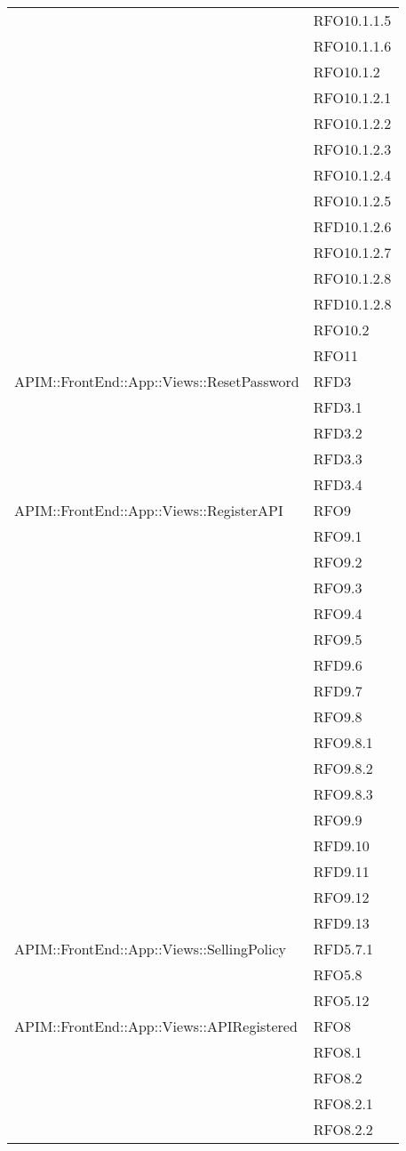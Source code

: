 \begin{longtable}{ p{12cm} | p{4cm} }
	& RFO10.1.1.5 \\
	& RFO10.1.1.6 \\
	& RFO10.1.2 \\
	& RFO10.1.2.1 \\
	& RFO10.1.2.2 \\
	& RFO10.1.2.3 \\
	& RFO10.1.2.4 \\
	& RFO10.1.2.5 \\
	& RFD10.1.2.6 \\
	& RFO10.1.2.7 \\
	& RFO10.1.2.8 \\
	& RFD10.1.2.8 \\
	& RFO10.2 \\
	& RFO11 \\
	\hline
	APIM::FrontEnd::App::Views::ResetPassword
	& RFD3 \\
	& RFD3.1 \\
	& RFD3.2 \\
	& RFD3.3 \\
	& RFD3.4 \\
	\hline
	APIM::FrontEnd::App::Views::RegisterAPI
	& RFO9 \\
	& RFO9.1 \\
	& RFO9.2 \\
	& RFO9.3 \\
	& RFO9.4 \\
	& RFO9.5 \\
	& RFD9.6 \\
	& RFD9.7 \\
	& RFO9.8 \\
	& RFO9.8.1 \\
	& RFO9.8.2 \\
	& RFO9.8.3 \\
	& RFO9.9 \\
	& RFD9.10 \\
	& RFD9.11 \\
	& RFO9.12 \\
	& RFD9.13 \\
	\hline
	APIM::FrontEnd::App::Views::SellingPolicy
	& RFD5.7.1 \\
	& RFO5.8 \\
	& RFO5.12 \\
	\hline
	APIM::FrontEnd::App::Views::APIRegistered
	& RFO8 \\
	& RFO8.1 \\
	& RFO8.2 \\
	& RFO8.2.1 \\
	& RFO8.2.2 \\

\end{longtable}
